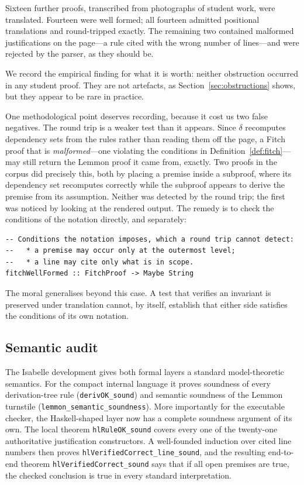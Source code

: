 \documentclass[11pt]{article}
\theoremstyle{plain}
\theoremstyle{definition}
\theoremstyle{remark}
\begin{document}
Sixteen further proofs, transcribed from photographs of student work, were
translated. Fourteen were well formed; all fourteen admitted positional
translations and round-tripped exactly. The remaining two contained malformed
justifications on the page---a rule cited with the wrong number of
lines---and were rejected by the parser, as they should be.

We record the empirical finding for what it is worth: neither obstruction
occurred in any student proof. They are not artefacts, as
Section~\ref{sec:obstructions} shows, but they appear to be rare in practice.

One methodological point deserves recording, because it cost us two false
negatives. The round trip is a weaker test than it appears. Since $\delta$
recomputes dependency sets from the rules rather than reading them off the
page, a Fitch proof that is \emph{malformed}---one violating the conditions in
Definition~\ref{def:fitch}---may still return the Lemmon proof it came from,
exactly. Two proofs in the corpus did precisely this, both by placing a
premise inside a subproof, where its dependency set recomputes correctly while
the subproof appears to derive the premise from its assumption. Neither was
detected by the round trip; the first was noticed by looking at the rendered
output. The remedy is to check the conditions of the notation directly, and
separately:

\begin{lstlisting}
-- Conditions the notation imposes, which a round trip cannot detect:
--   * a premise may occur only at the outermost level;
--   * a line may cite only what is in scope.
fitchWellFormed :: FitchProof -> Maybe String
\end{lstlisting}

\noindent The moral generalises beyond this case. A test that verifies an
invariant is preserved under translation cannot, by itself, establish that
either side satisfies the conditions of its own notation.

\subsection{Semantic audit}

The Isabelle development gives both formal layers a standard model-theoretic
semantics.  For the compact internal language it proves soundness of every
derivation-tree rule (\texttt{derivOK\allowbreak\_sound}) and semantic soundness of the
Lemmon turnstile (\verb|lemmon_semantic_soundness|).  More importantly for the
executable checker, the Haskell-shaped layer now has a complete soundness
argument of its own.  The local theorem \verb|hlRuleOK_sound| covers every one
of the twenty-one authoritative justification constructors.  A well-founded
induction over cited line numbers then proves
\texttt{hlVerifiedCorrect\allowbreak\_line\allowbreak\_sound}, and the
resulting end-to-end theorem
\texttt{hlVerifiedCorrect\allowbreak\_sound} says that
if all open premises are true, the checked conclusion is true in every standard
interpretation.
\end{document}
